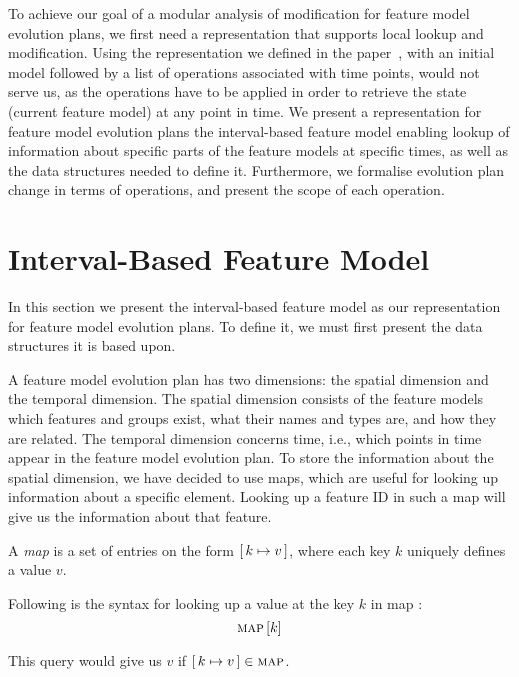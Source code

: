 To achieve our goal of a modular analysis of modification for feature model evolution plans, we first need a representation that supports local lookup and modification. Using the representation we defined in the paper~\cite{art:consistency-preserving-evolution-planning}, with an initial model followed by a list of operations associated with time points, would not serve us, as the operations have to be applied in order to retrieve the state (current feature model) at any point in time. We present a representation for feature model evolution plans \textemdash{} the interval-based feature model \textemdash{} enabling lookup of information about specific parts of the feature models at specific times, as well as the data structures needed to define it. Furthermore, we formalise evolution plan change in terms of operations, and present the scope of each operation. 

\section{Interval-Based Feature Model}
\label{sec:interval-based-feature-model}
In this section we present the interval-based feature model as our representation for feature model evolution plans. To define it, we must first present the data structures it is based upon.

A feature model evolution plan has two dimensions: the spatial dimension and the temporal dimension. The spatial dimension consists of the feature models \textemdash{} which features and groups exist, what their names and types are, and how they are related. The temporal dimension concerns time, i.e., which points in time appear in the feature model evolution plan. To store the information about the spatial dimension, we have decided to use maps, which are useful for looking up information about a specific element. Looking up a feature ID in such a map will give us the information about that feature. 
\\

\begin{definition}[Map]
  A \emph{map} is a set of entries on the form $[ \,k \mapsto v\, ]$, where each key $k$ uniquely defines a value $v$. 
  \label{def:map}
\end{definition}

Following is the syntax for looking up a value at the key $k$ in map :
\[
  \textsc{map} \left[ k \right]
\]

This query would give us $v$ if $[ \,k \mapsto v\, ] \in \textsc{map}$.

